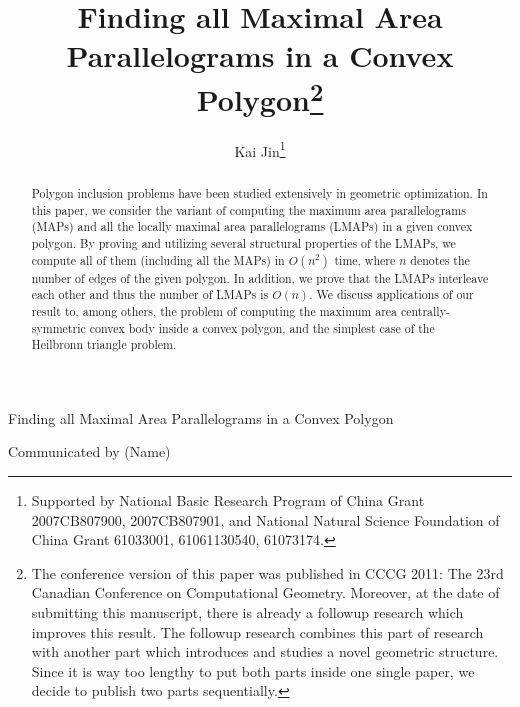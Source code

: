 \documentclass{ws-ijcga}
\begin{document}
{Finding all Maximal Area Parallelograms in a Convex Polygon}

\catchline

\title{Finding all Maximal Area Parallelograms in a Convex Polygon\footnote{The conference version of this paper was published in CCCG 2011: The 23rd Canadian Conference on Computational Geometry. Moreover, at the date of submitting this manuscript, there is already a followup research which improves this result.
The followup research combines this part of research with another part which introduces and studies a novel geometric structure.
Since it is way too lengthy to put both parts inside one single paper, we decide to publish two parts sequentially.}}

\author{Kai Jin\footnote{Supported by National Basic Research Program of China Grant 2007CB807900, 2007CB807901, and National Natural Science Foundation of China Grant 61033001, 61061130540, 61073174.}}

\address{Department of Computer Science, The University of Hong Kong,\\
Pokfulam Road, Hong Kong SAR, China. \\ \texttt{cscjjk@gmail.com}
}

\maketitle

{Communicated by (Name)}

\begin{abstract}
Polygon inclusion problems have been studied extensively in geometric optimization.
In this paper, we consider the variant of computing the maximum area parallelograms (MAPs) and
  all the locally maximal area parallelograms (LMAPs) in a given convex polygon.
By proving and utilizing several structural properties of the LMAPs, we compute all of them (including all the MAPs)
  in $O(n^2)$ time, where $n$ denotes the number of edges of the given polygon.
In addition, we prove that the LMAPs interleave each other and thus the number of LMAPs is $O(n)$.
We discuss applications of our result to, among others, the problem of computing
  the maximum area centrally-symmetric convex body inside a convex polygon,
  and the simplest case of the Heilbronn triangle problem.

\end{abstract}
\end{document}
